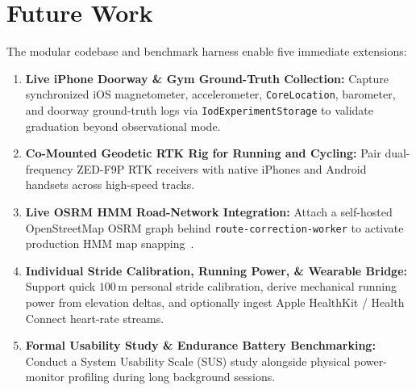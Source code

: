 \section{Future Work}
The modular codebase and benchmark harness enable five immediate extensions:
\begin{enumerate}
    \item \textbf{Live iPhone Doorway \& Gym Ground-Truth Collection:} Capture synchronized iOS magnetometer, accelerometer, \texttt{CoreLocation}, barometer, and doorway ground-truth logs via \texttt{IodExperimentStorage} to validate graduation beyond observational mode.
    \item \textbf{Co-Mounted Geodetic RTK Rig for Running and Cycling:} Pair dual-frequency ZED-F9P RTK receivers with native iPhones and Android handsets across high-speed tracks.
    \item \textbf{Live OSRM HMM Road-Network Integration:} Attach a self-hosted OpenStreetMap OSRM graph behind \texttt{route-correction-worker} to activate production HMM map snapping~\cite{newson2009hidden}.
    \item \textbf{Individual Stride Calibration, Running Power, \& Wearable Bridge:} Support quick $100$\,m personal stride calibration, derive mechanical running power from elevation deltas, and optionally ingest Apple HealthKit / Health Connect heart-rate streams.
    \item \textbf{Formal Usability Study \& Endurance Battery Benchmarking:} Conduct a System Usability Scale (SUS) study alongside physical power-monitor profiling during long background sessions.
\end{enumerate}
